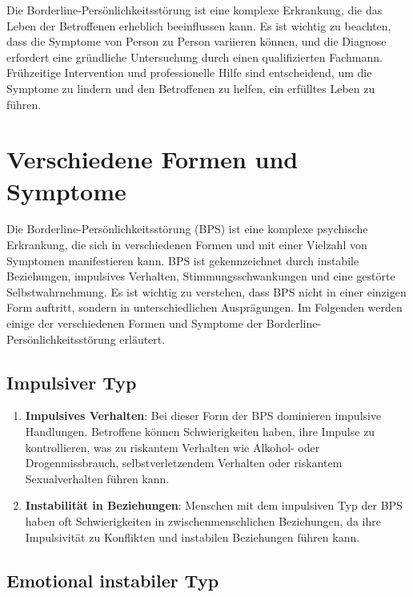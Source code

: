 Die Borderline-Persönlichkeitsstörung ist eine komplexe Erkrankung, die das Leben der Betroffenen erheblich beeinflussen kann. Es ist wichtig zu beachten, dass die Symptome von Person zu Person variieren können, und die Diagnose erfordert eine gründliche Untersuchung durch einen qualifizierten Fachmann. Frühzeitige Intervention und professionelle Hilfe sind entscheidend, um die Symptome zu lindern und den Betroffenen zu helfen, ein erfülltes Leben zu führen.


\section{Verschiedene Formen und Symptome}

Die Borderline-Persönlichkeitsstörung (BPS) ist eine komplexe psychische Erkrankung, die sich in verschiedenen Formen und mit einer Vielzahl von Symptomen manifestieren kann. BPS ist gekennzeichnet durch instabile Beziehungen, impulsives Verhalten, Stimmungsschwankungen und eine gestörte Selbstwahrnehmung. Es ist wichtig zu verstehen, dass BPS nicht in einer einzigen Form auftritt, sondern in unterschiedlichen Ausprägungen. Im Folgenden werden einige der verschiedenen Formen und Symptome der Borderline-Persönlichkeitsstörung erläutert.

\subsection{Impulsiver Typ}

\begin{enumerate}
\item \textbf{Impulsives Verhalten}: Bei dieser Form der BPS dominieren impulsive Handlungen. Betroffene können Schwierigkeiten haben, ihre Impulse zu kontrollieren, was zu riskantem Verhalten wie Alkohol- oder Drogenmissbrauch, selbstverletzendem Verhalten oder riskantem Sexualverhalten führen kann.

\item \textbf{Instabilität in Beziehungen}: Menschen mit dem impulsiven Typ der BPS haben oft Schwierigkeiten in zwischenmenschlichen Beziehungen, da ihre Impulsivität zu Konflikten und instabilen Beziehungen führen kann.
\end{enumerate}

\subsection{Emotional instabiler Typ}

